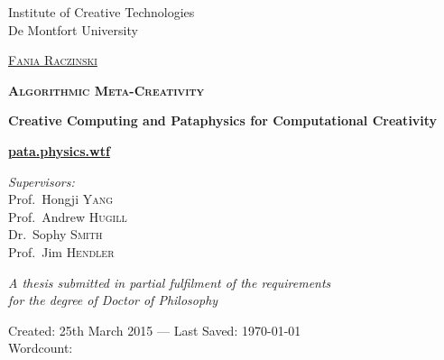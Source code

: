
\begin{titlingpage}
\begin{center}

Institute of Creative Technologies\\
De Montfort University

\vspace{1cm}

\textsc{\huge \href{http://fania.uk}{Fania Raczinski}}

\vspace{1.5cm}


\textsc{\bfseries\scshape\sffamily \fontsize{40}{30}\selectfont Algorithmic Meta-Creativity}

\vspace{1cm}

{\huge \bfseries Creative Computing and Pataphysics for Computational Creativity}

\vspace{1cm}
{\Huge \textbf{\url{pata.physics.wtf}}}
\vspace{1.5cm}

\emph{Supervisors:}\\
{Prof.\ Hongji \textsc{Yang}}\\
{Prof.\ Andrew \textsc{Hugill}}\\
{Dr.\ Sophy \textsc{Smith}}\\
{Prof.\ Jim \textsc{Hendler}}

\vspace{1.5cm}

\large \textit{A thesis submitted in partial fulfilment of the requirements\\ for the degree of Doctor of Philosophy}

\vfill

Created: {25th March 2015} --- Last Saved: {\today}\\
Wordcount: \wordcount

\end{center}
\end{titlingpage}

